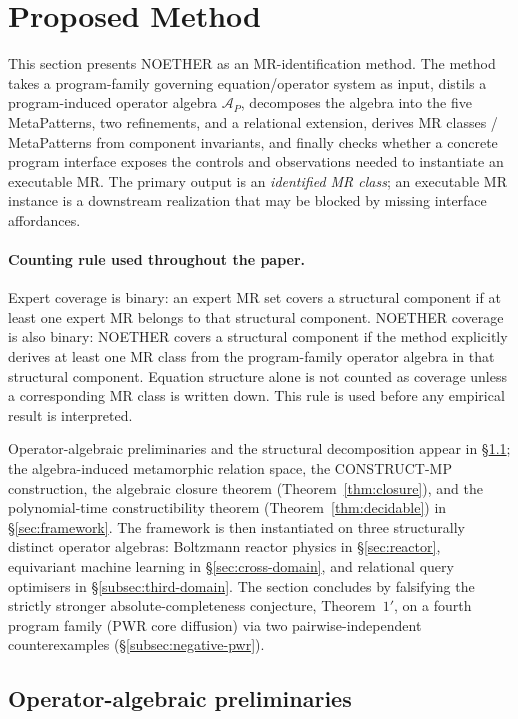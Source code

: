 \documentclass[acmsmall,screen,review]{acmart}
\begin{document}
\section{Proposed Method}
\label{sec:noether-framework}

This section presents NOETHER as an MR-identification method. The method takes a program-family governing equation/operator system as input, distils a program-induced operator algebra $\mathcal{A}_P$, decomposes the algebra into the five MetaPatterns, two refinements, and a relational extension, derives MR classes / MetaPatterns from component invariants, and finally checks whether a concrete program interface exposes the controls and observations needed to instantiate an executable MR. The primary output is an \emph{identified MR class}; an executable MR instance is a downstream realization that may be blocked by missing interface affordances.

\paragraph{Counting rule used throughout the paper.}
Expert coverage is binary: an expert MR set covers a structural component if at least one expert MR belongs to that structural component. NOETHER coverage is also binary: NOETHER covers a structural component if the method explicitly derives at least one MR class from the program-family operator algebra in that structural component. Equation structure alone is not counted as coverage unless a corresponding MR class is written down. This rule is used before any empirical result is interpreted.

Operator-algebraic preliminaries and the structural decomposition appear in \S\ref{sec:prelim}; the algebra-induced metamorphic relation space, the CONSTRUCT-MP construction, the algebraic closure theorem (Theorem~\ref{thm:closure}), and the polynomial-time constructibility theorem (Theorem~\ref{thm:decidable}) in \S\ref{sec:framework}. The framework is then instantiated on three structurally distinct operator algebras: Boltzmann reactor physics in \S\ref{sec:reactor}, equivariant machine learning in \S\ref{sec:cross-domain}, and relational query optimisers in \S\ref{subsec:third-domain}. The section concludes by falsifying the strictly stronger absolute-completeness conjecture, Theorem~$1'$, on a fourth program family (PWR core diffusion) via two pairwise-independent counterexamples (\S\ref{subsec:negative-pwr}).

\subsection{Operator-algebraic preliminaries}
\label{sec:prelim}
\end{document}
